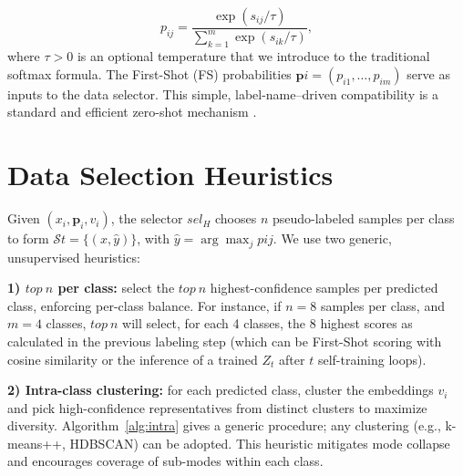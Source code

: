 \documentclass[]{politex-xico}
\begin{document}
\begin{equation}
p_{ij} = \frac{\exp(s_{ij}/\tau)}{\sum_{k=1}^{m}\exp(s_{ik}/\tau)},
\label{eq:firstshotsprobs}
\end{equation}
where $\tau>0$ is an optional temperature that we introduce to the traditional softmax formula. The First-Shot (FS) probabilities $\mathbf{p}i=(p_{i1},\dots,p_{im})$ serve as inputs to the data selector. This simple, label-name–driven compatibility is a standard and efficient zero-shot mechanism \cite{yin2019benchmarking}.

\section{Data Selection Heuristics}
\label{sec:selection}

Given ${(x_i,\mathbf{p}_i,v_i)}$, the selector $sel_H$ chooses $n$ pseudo-labeled samples per class to form $\mathcal{S}t = \{(x,\hat{y})\}$, with $\hat{y}=\arg\max_j p{ij}$. We use two generic, unsupervised heuristics:

\textbf{1) $top~n$ per class:} select the $top~n$ highest-confidence samples per predicted class, enforcing per-class balance. For instance, if $n = 8$ samples per class, and $m = 4$ classes, $top~n$ will select, for each 4 classes, the 8 highest scores as calculated in the previous labeling step (which can be First-Shot scoring with cosine similarity or the inference of a trained $Z_t$ after $t$ self-training loops).

\textbf{2) Intra-class clustering:} for each predicted class, cluster the embeddings ${v_i}$ and pick high-confidence representatives from distinct clusters to maximize diversity. Algorithm~\ref{alg:intra} gives a generic procedure; any clustering (e.g., k-means++, HDBSCAN) can be adopted. This heuristic mitigates mode collapse and encourages coverage of sub-modes within each class.

\begin{algorithm}[h]
\caption{Data Selection via Intra-class Clustering}
\label{alg:intra}
\end{algorithm}
\end{document}
